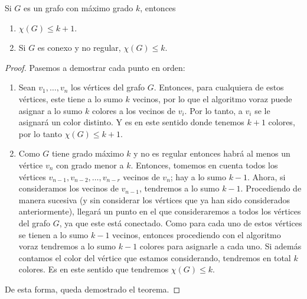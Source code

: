 \begin{teo}
    Si $G$ es un grafo con máximo grado $k$, entonces
    
    \begin{enumerate}
        \item $\chi(G) \leq k+1$.
        \item Si $G$ es conexo y no regular, $\chi(G) \leq k$.
    \end{enumerate}
\end{teo}

\begin{proof}
    Pasemos a demostrar cada punto en orden:
    
    \begin{enumerate}
        \item Sean $v_1, \dots, v_n$ los vértices del grafo $G$. Entonces, para cualquiera de estos vértices, este tiene a lo sumo $k$ vecinos, por lo que el algoritmo voraz puede asignar a lo sumo $k$ colores a los vecinos de $v_i$. Por lo tanto, a $v_i$ se le asignará un color distinto. Y es en este sentido donde tenemos $k+1$ colores, por lo tanto $\chi(G) \leq k+1$.
        \item Como $G$ tiene grado máximo $k$ y no es regular entonces habrá al menos un vértice $v_n$ con grado menor a $k$. Entonces, tomemos en cuenta todos los vértices $v_{n-1}, v_{n-2}, \dots, v_{n-r}$ vecinos de $v_n$; hay a lo sumo $k-1$. Ahora, si consideramos los vecinos de $v_{n-1}$, tendremos a lo sumo $k-1$. Procediendo de manera sucesiva (y sin considerar los vértices que ya han sido considerados anteriormente), llegará un punto en el que consideraremos a todos los vértices del grafo $G$, ya que este está conectado. Como para cada uno de estos vértices se tienen a lo sumo $k-1$ vecinos, entonces procediendo con el algoritmo voraz tendremos a lo sumo $k-1$ colores para asignarle a cada uno. Si además contamos el color del vértice que estamos considerando, tendremos en total $k$ colores. Es en este sentido que tendremos $\chi(G) \leq k$.
    \end{enumerate}
    
    De esta forma, queda demostrado el teorema.
\end{proof}